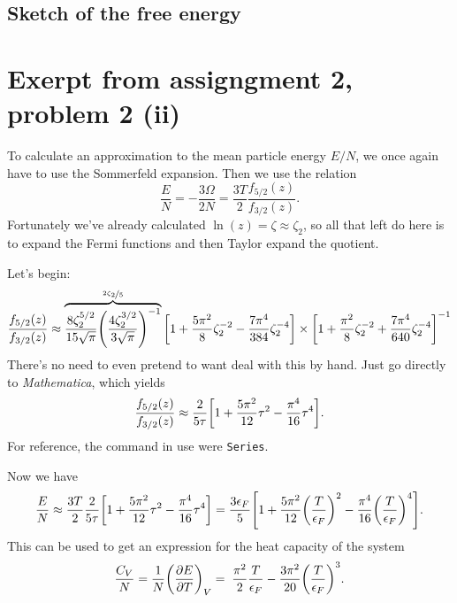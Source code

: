 \documentclass[11pt,letter, swedish, english
]{article}
\begin{document}
\subsection{Sketch of the free energy}





















\newpage
\appendix
\setcounter{equation}{0}
\renewcommand{\theequation}{A\arabic{equation}}

\section{Exerpt from assigngment 2, problem 2 (ii)}
\label{sec:ass_2_Cv}
To calculate an approximation to the mean particle energy $E/N$, we
once again have to use the Sommerfeld expansion. Then we use the relation
\begin{equation}
\frac{E}{N}=-\frac{3\Omega}{2N}=\frac{3T}{2}\frac{f_{5/2}(z)}{f_{3/2}(z)}.
\end{equation}
Fortunately we've already calculated $\ln(z)=\zeta\approx\zeta_2$, so all
that left do here is to expand the Fermi functions and then
Taylor expand the quotient.

Let's begin:
\begin{equation}
\frac{f_{5/2}(z)}{f_{3/2}(z)}\approx
\overbrace{\frac{8\zeta_2^{5/2}}{15\sqrt{\pi}}
\qty(\frac{4\zeta_2^{3/2}}{3\sqrt{\pi}})^{-1}}^{\nicefrac{2\zeta_2}{5}}
\qty[1+\frac{5\pi^2}{8}\zeta_2^{-2}
-\frac{7\pi^4}{384}\zeta_2^{-4} ]
\times \qty[1+\frac{\pi^2}{8}\zeta_2^{-2} 
+\frac{7\pi^4}{640}\zeta_2^{-4} ]^{-1}
\end{equation}
There's no need to even pretend to want deal with this by hand.
Just go directly to \emph{Mathematica}, which yields
\begin{equation}
\frac{f_{5/2}(z)}{f_{3/2}(z)}\approx \frac{2}{5\tau}
\qty[1+\frac{5\pi^2}{12}\tau^2-\frac{\pi^4}{16}\tau^4].
\end{equation}
For reference, the command in use were \texttt{Series}.

Now we have
\begin{equation}
\frac{E}{N}\approx\frac{3T}{2}\frac{2}{5\tau}
\qty[1+\frac{5\pi^2}{12}\tau^2-\frac{\pi^4}{16}\tau^4]
=\frac{3\epsilon_F}{5}\qty[1
+\frac{5\pi^2}{12}\qty(\frac{T}{\epsilon_F})^2
-\frac{\pi^4}{16}\qty(\frac{T}{\epsilon_F})^4].
\end{equation}
This can be used to get an expression for the heat capacity of the
system
\begin{equation}\label{eq:CV_Fermi}
\frac{C_V}{N}=\frac{1}{N}\qty(\pdv{E}{T})_V
=\;\frac{\pi^2}{2}\frac{T}{\epsilon_F}
 - \frac{3\pi^2}{20}\qty(\frac{T}{\epsilon_F})^3.
\end{equation}
\end{document}
